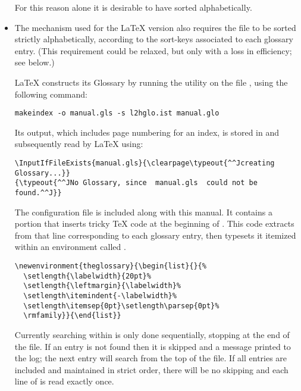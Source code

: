 \begin{itemize}
\noindent
For this reason alone it is desirable to have  sorted alphabetically.\par

\item
The mechanism used for the \LaTeX{} version also requires the file to be sorted
strictly alphabetically, according to the sort-keys associated to each glossary entry.
\newline
(This requirement could be relaxed, but only with a loss in efficiency; see below.)

\LaTeX{} constructs its Glossary by running the  utility 
on the file , using the following command:
%
\begin{small}%
\begin{verbatim}
makeindex -o manual.gls -s l2hglo.ist manual.glo
\end{verbatim}
\end{small}%
%
Its output, which includes page numbering for an index, is stored in 
and subsequently read by \LaTeX{} using:

\begin{small}%
\begin{verbatim}
\InputIfFileExists{manual.gls}{\clearpage\typeout{^^Jcreating Glossary...}}
{\typeout{^^JNo Glossary, since  manual.gls  could not be found.^^J}}
\end{verbatim}%
\end{small}%

\noindent
The configuration file  is included along with this manual.
It contains a portion that inserts tricky \TeX{} code at the beginning of .
This code extracts from  that line corresponding to each glossary entry, 
then typesets it itemized within an environment called .

\begin{small}%
\begin{verbatim}
\newenvironment{theglossary}{\begin{list}{}{%
  \setlength{\labelwidth}{20pt}%
  \setlength{\leftmargin}{\labelwidth}%
  \setlength\itemindent{-\labelwidth}%
  \setlength\itemsep{0pt}\setlength\parsep{0pt}%
  \rmfamily}}{\end{list}}
\end{verbatim}
\end{small}%
%
Currently searching within  is only done sequentially, stopping
at the end of the file. If an entry is not found then it is skipped and a message
printed to the log; the next entry will search from the top of the file.
If all entries are included and maintained in strict order, there will be no skipping 
and each line of  is read exactly once.\par


\end{itemize}

